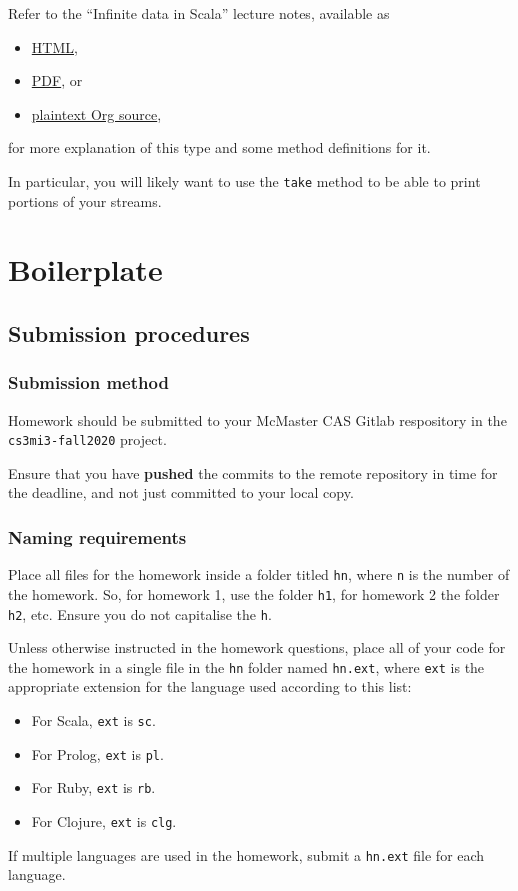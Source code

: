 \documentclass[11pt]{article}
\begin{document}
Refer to the “Infinite data in Scala” lecture notes, available as
\begin{itemize}
\item \href{./../notes/live-coding/10-02-infinite-data-in-Scala.html}{HTML},
\item \href{./../notes/live-coding/10-02-infinite-data-in-Scala.pdf}{PDF}, or
\item \href{./../notes/live-coding/10-02-infinite-data-in-Scala.org}{plaintext Org source},
\end{itemize}
for more explanation of this type
and some method definitions for it.

In particular, you will likely want to use the \texttt{take} method
to be able to print portions of your streams.

\section*{Boilerplate}
\label{sec:org5675385}
\subsection*{Submission procedures}
\label{sec:org84314da}
\subsubsection*{Submission method}
\label{sec:org6ad291e}

Homework should be submitted to your McMaster CAS Gitlab respository
in the \texttt{cs3mi3-fall2020} project.

Ensure that you have \textbf{pushed} the commits to the remote repository
in time for the deadline, and not just committed to your local copy.

\subsubsection*{Naming requirements}
\label{sec:orgd522cda}

Place all files for the homework
inside a folder titled \texttt{hn}, where \texttt{n} is the number of the homework.
So, for homework 1, use the folder \texttt{h1}, for homework 2 the folder \texttt{h2}, etc.
Ensure you do not capitalise the \texttt{h}.

Unless otherwise instructed in the homework questions,
place all of your code for the homework
in a single file in the \texttt{hn} folder named \texttt{hn.ext},
where \texttt{ext} is the appropriate extension for the language used
according to this list:
\begin{itemize}
\item For Scala, \texttt{ext} is \texttt{sc}.
\item For Prolog, \texttt{ext} is \texttt{pl}.
\item For Ruby, \texttt{ext} is \texttt{rb}.
\item For Clojure, \texttt{ext} is \texttt{clg}.
\end{itemize}
If multiple languages are used in the homework,
submit a \texttt{hn.ext} file for each language.
\end{document}
